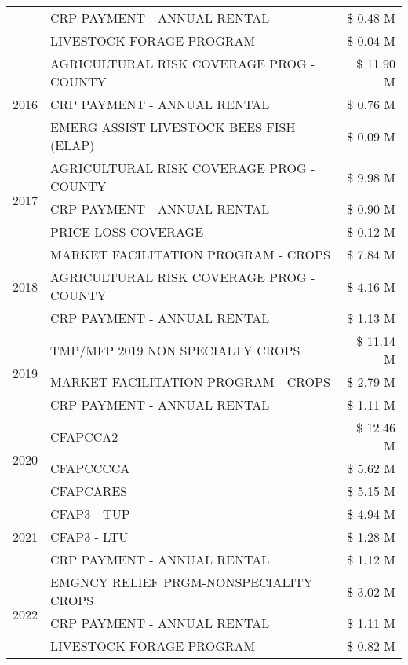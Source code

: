 \begin{tabular}{llr}
 & CRP PAYMENT - ANNUAL RENTAL & \$ 0.48 M \\
 & LIVESTOCK FORAGE PROGRAM & \$ 0.04 M \\
\cline{1-3}
\multirow[t]{3}{*}{2016} & AGRICULTURAL RISK COVERAGE PROG - COUNTY & \$ 11.90 M \\
 & CRP PAYMENT - ANNUAL RENTAL & \$ 0.76 M \\
 & EMERG ASSIST LIVESTOCK BEES FISH (ELAP) & \$ 0.09 M \\
\cline{1-3}
\multirow[t]{3}{*}{2017} & AGRICULTURAL RISK COVERAGE PROG - COUNTY & \$ 9.98 M \\
 & CRP PAYMENT - ANNUAL RENTAL & \$ 0.90 M \\
 & PRICE LOSS COVERAGE & \$ 0.12 M \\
\cline{1-3}
\multirow[t]{3}{*}{2018} & MARKET FACILITATION PROGRAM - CROPS & \$ 7.84 M \\
 & AGRICULTURAL RISK COVERAGE PROG - COUNTY & \$ 4.16 M \\
 & CRP PAYMENT - ANNUAL RENTAL & \$ 1.13 M \\
\cline{1-3}
\multirow[t]{3}{*}{2019} & TMP/MFP 2019 NON SPECIALTY CROPS & \$ 11.14 M \\
 & MARKET FACILITATION PROGRAM - CROPS & \$ 2.79 M \\
 & CRP PAYMENT - ANNUAL RENTAL & \$ 1.11 M \\
\cline{1-3}
\multirow[t]{3}{*}{2020} & CFAPCCA2 & \$ 12.46 M \\
 & CFAPCCCCA & \$ 5.62 M \\
 & CFAPCARES & \$ 5.15 M \\
\cline{1-3}
\multirow[t]{3}{*}{2021} & CFAP3 - TUP & \$ 4.94 M \\
 & CFAP3 - LTU & \$ 1.28 M \\
 & CRP PAYMENT - ANNUAL RENTAL & \$ 1.12 M \\
\cline{1-3}
\multirow[t]{3}{*}{2022} & EMGNCY RELIEF PRGM-NONSPECIALITY CROPS & \$ 3.02 M \\
 & CRP PAYMENT - ANNUAL RENTAL & \$ 1.11 M \\
 & LIVESTOCK FORAGE PROGRAM & \$ 0.82 M \\
\cline{1-3}
\bottomrule
\end{tabular}
